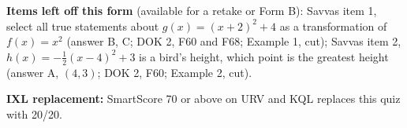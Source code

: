 \documentclass[11pt]{article}
\begin{document}
\textbf{Items left off this form} (available for a retake or Form B): Savvas item 1, select all true statements about $g(x)=(x+2)^2+4$ as a transformation of $f(x)=x^2$ (answer B, C; DOK 2, F60 and F68; Example 1, cut); Savvas item 2, $h(x)=-\frac{1}{2}(x-4)^2+3$ is a bird's height, which point is the greatest height (answer A, $(4,3)$; DOK 2, F60; Example 2, cut).

\textbf{IXL replacement:} SmartScore 70 or above on URV and KQL replaces this quiz with 20/20.
\end{document}
